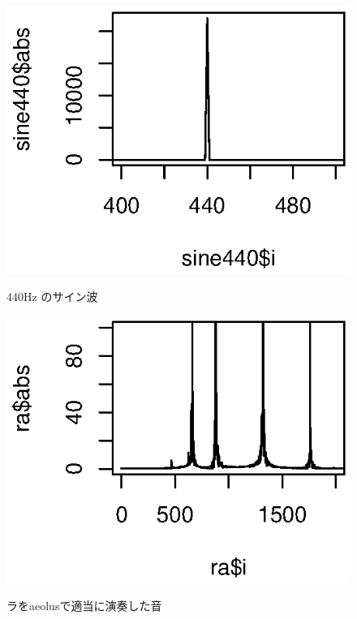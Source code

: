 \documentclass[mingoth,a4paper]{jsarticle}
\begin{document}
\begin{figure}[ht]
\begin{center}
 \begin{minipage}{0.4\hsize}
 \begin{center}
  \includegraphics{image201003/sine.eps}
 \end{center} 
 \label{fig:wave-sine}
 \caption{440Hz のサイン波}
 \end{minipage}
 \begin{minipage}{0.4\hsize}
 \begin{center}
  \includegraphics{image201003/ra.eps}
 \end{center} 
 \label{fig:wave-ra}
 \caption{ラをaeolusで適当に演奏した音}
 \end{minipage}
\end{center}
\end{figure}
\end{document}

